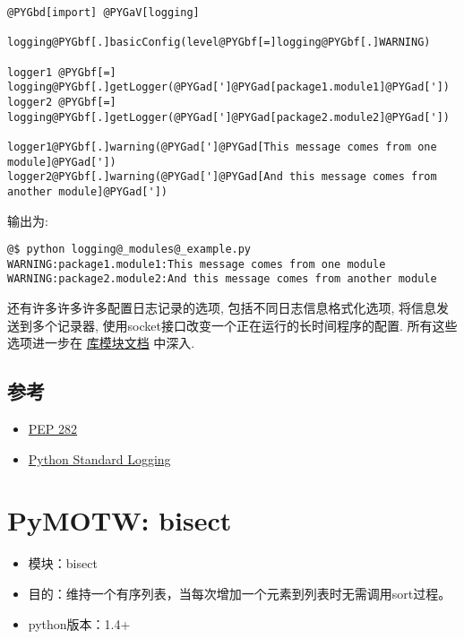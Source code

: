 \documentclass[letterpaper,10pt,english]{manual}
\begin{document}
\begin{Verbatim}[commandchars=@\[\]]
@PYGbd[import] @PYGaV[logging]

logging@PYGbf[.]basicConfig(level@PYGbf[=]logging@PYGbf[.]WARNING)

logger1 @PYGbf[=] logging@PYGbf[.]getLogger(@PYGad[']@PYGad[package1.module1]@PYGad['])
logger2 @PYGbf[=] logging@PYGbf[.]getLogger(@PYGad[']@PYGad[package2.module2]@PYGad['])

logger1@PYGbf[.]warning(@PYGad[']@PYGad[This message comes from one module]@PYGad['])
logger2@PYGbf[.]warning(@PYGad[']@PYGad[And this message comes from another module]@PYGad['])
\end{Verbatim}

输出为:

\begin{Verbatim}[commandchars=@\[\]]
@$ python logging@_modules@_example.py
WARNING:package1.module1:This message comes from one module
WARNING:package2.module2:And this message comes from another module
\end{Verbatim}

还有许多许多许多配置日志记录的选项, 包括不同日志信息格式化选项, 将信息发送到多个记录器, 使用socket接口改变一个正在运行的长时间程序的配置. 所有这些选项进一步在 \href{http://docs.python.org/lib/module-logging.html}{库模块文档} 中深入.


\subsection{参考}
\begin{itemize}
\item {} 
\href{http://www.python.org/dev/peps/pep-0282/}{PEP 282}

\item {} 
\href{http://www.onlamp.com/pub/a/python/2005/06/02/}{Python Standard Logging}

\end{itemize}

\resetcurrentobjects


\section{PyMOTW: bisect}
\begin{itemize}
\item {} 
模块：bisect

\item {} 
目的：维持一个有序列表，当每次增加一个元素到列表时无需调用sort过程。

\item {} 
python版本：1.4+

\end{itemize}
\end{document}
